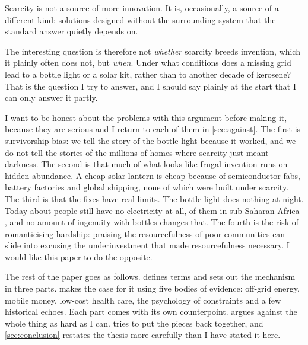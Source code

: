 \begin{keyidea}
Scarcity is not a source of more innovation. It is, occasionally, a source of
a different kind: solutions designed without the surrounding system that the
standard answer quietly depends on.
\end{keyidea}

The interesting question is therefore not \emph{whether} scarcity breeds
invention, which it plainly often does not, but \emph{when}. Under what
conditions does a missing grid lead to a bottle light or a solar kit, rather
than to another decade of kerosene? That is the question I try to answer, and
I should say plainly at the start that I can only answer it partly.

I want to be honest about the problems with this argument before making it,
because they are serious and I return to each of them in
\cref{sec:against}. The first is survivorship bias: we tell the story of the
bottle light because it worked, and we do not tell the stories of the millions
of homes where scarcity just meant darkness. The second is that much of what
looks like frugal invention runs on hidden abundance. A cheap solar lantern is
cheap because of semiconductor fabs, battery factories and global shipping,
none of which were built under scarcity. The third is that the fixes have real
limits. The bottle light does nothing at night. Today about
\sdgWithoutElecWorld{} people still have no electricity at all, \sdgWithoutElecSSA{}
of them in sub-Saharan Africa \parencite{esmap2026sdg7}, and no amount of
ingenuity with bottles changes that. The fourth is the risk of romanticising
hardship: praising the resourcefulness of poor communities can slide into
excusing the underinvestment that made resourcefulness necessary. I would like
this paper to do the opposite.

The rest of the paper goes as follows.  defines terms and sets
out the mechanism in three parts.  makes the case for it
using five bodies of evidence: off-grid energy, mobile money, low-cost health
care, the psychology of constraints and a few historical echoes. Each part
comes with its own counterpoint.  argues against the whole
thing as hard as I can.  tries to put the pieces back
together, and \cref{sec:conclusion} restates the thesis more carefully than I
have stated it here.

